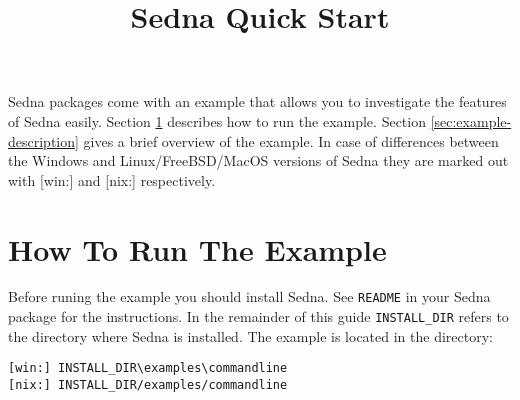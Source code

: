 \documentclass[a4paper,12pt]{article}
\title{Sedna Quick Start}
\date{}
\begin{document}
\sloppy
\maketitle

Sedna packages come with an example that allows you to investigate the features
of Sedna easily. Section \ref{sec:how-to-run} describes how to run the example.
Section \ref{sec:example-description} gives a brief overview of the example. In
case of differences between the Windows and Linux/FreeBSD/MacOS versions of
Sedna they are marked out with [win:] and [nix:] respectively.

\section{How To Run The Example} 
\label{sec:how-to-run} 

Before runing the example you should install Sedna. See \verb!README! in your
Sedna package for the instructions. In the remainder of this guide
\verb!INSTALL_DIR! refers to the directory where Sedna is installed. The example
is located in the directory:

\begin{verbatim}
[win:] INSTALL_DIR\examples\commandline
[nix:] INSTALL_DIR/examples/commandline
\end{verbatim}
\end{document}
